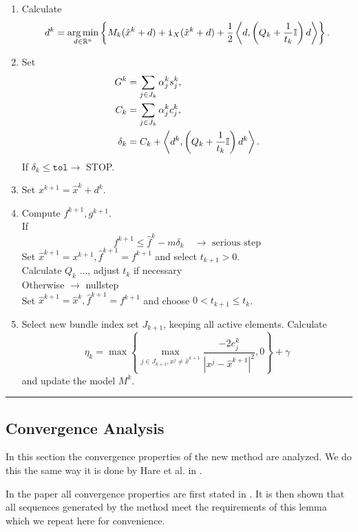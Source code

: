 \begin{enumerate}
	\item Calculate \[d^k = \operatorname*{arg\,min}_{d \in \mathbb{R}^n} \left\{ M_k(\hat{x}^k+d)+\mathtt{i}_X(\hat{x}^k+d)+\frac{1}{2}\left\langle d,\left(Q_k+\frac{1}{t_k}\mathbb{I}\right)d\right\rangle\right\}.\]
	\item Set %
		\begin{align*} 
		  G^k &= \sum_{j \in J_k}{\alpha_j^k s_j^k}, \\ %
			C_k &= \sum_{j \in J_k}{\alpha_j^k c_j^k}, \\
	    \delta_k &=  C_k + \Langle d^k,\left(Q_k+\frac{1}{t_k}\mathbb{I}\right)d^k\Rangle.
		\end{align*}
		If \(\delta_k \leq \mathtt{tol} \rightarrow \) STOP.
	\item Set \( x^{k+1} = \hat{x}^k + d^k \).
	\item Compute \(f^{k+1}, g^{k+1}\). \\
	If 
	\[f^{k+1} \leq \hat{f}^k - m\delta_k \quad \rightarrow \text{ serious step} \]
	Set \(\hat{x}^{k+1} = x^{k+1}, \hat{f}^{k+1} = f^{k+1}\) and select \(t_{k+1} > 0\). \\
	Calculate \(Q_k\) ..., adjust \(t_k\) if necessary\\
	Otherwise \(\rightarrow\) nullstep \\
	Set \(\hat{x}^{k+1} = \hat{x}^k, \hat{f}^{k+1}=f^{k+1}\) and choose \(0 < t_{k+1} \leq t_k\). 	
	\item Select new bundle index set \(J_{k+1}\), keeping all active elements. Calculate 
	\[ \eta_k = \max{\left\{\max_{j \in J_{k+1}, x^j \neq \hat{x}^{k+1}}{\frac{-2e_j^k}{|x^j - \hat{x}^{k+1}|^2}, 0}\right\}}+\gamma  \]
	and update the model \(M^k\).
\end{enumerate}
\vspace{1ex}
\hrule

\vspace{1.5em}

\subsection{Convergence Analysis}

In this section the convergence properties of the new method are analyzed. We do this the same way it is done by Hare et al. in \cite{Hare2016}.

In the paper all convergence properties are first stated in \cite[Lemma 5]{Hare2016}. It is then shown that all sequences generated by the method meet the requirements of this lemma which we repeat here for convenience.

